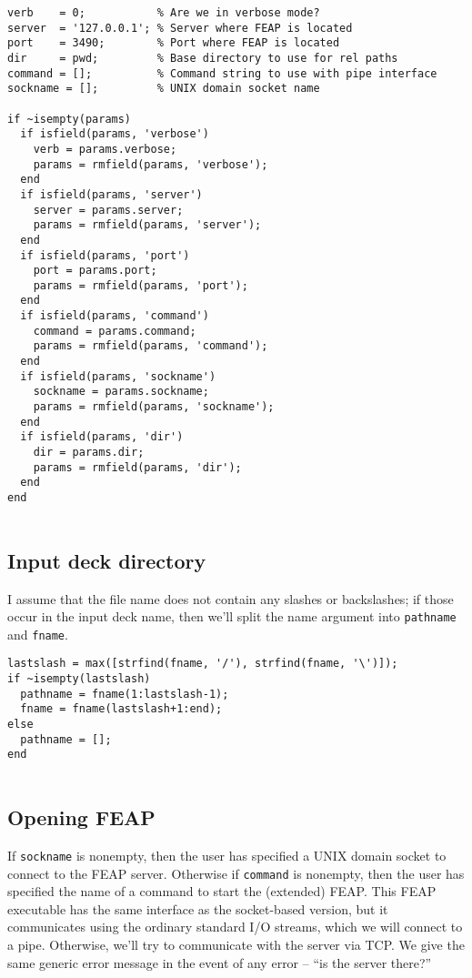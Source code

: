 \begin{verbatim}
verb    = 0;           % Are we in verbose mode?
server  = '127.0.0.1'; % Server where FEAP is located
port    = 3490;        % Port where FEAP is located
dir     = pwd;         % Base directory to use for rel paths
command = [];          % Command string to use with pipe interface
sockname = [];         % UNIX domain socket name

if ~isempty(params)
  if isfield(params, 'verbose')
    verb = params.verbose;
    params = rmfield(params, 'verbose');
  end
  if isfield(params, 'server')
    server = params.server;
    params = rmfield(params, 'server');
  end
  if isfield(params, 'port')
    port = params.port;
    params = rmfield(params, 'port');
  end
  if isfield(params, 'command')
    command = params.command;
    params = rmfield(params, 'command');
  end
  if isfield(params, 'sockname')
    sockname = params.sockname;
    params = rmfield(params, 'sockname');
  end
  if isfield(params, 'dir')
    dir = params.dir;
    params = rmfield(params, 'dir');
  end
end


\end{verbatim}
\subsection{Input deck directory}

I assume that the file name does not contain any slashes or
backslashes; if those occur in the input deck name, then we'll
split the name argument into {\tt pathname} and {\tt fname}.

\begin{verbatim}
lastslash = max([strfind(fname, '/'), strfind(fname, '\')]);
if ~isempty(lastslash)
  pathname = fname(1:lastslash-1);
  fname = fname(lastslash+1:end);
else
  pathname = [];
end


\end{verbatim}
\subsection{Opening FEAP}

If {\tt sockname} is nonempty, then the user has specified
a UNIX domain socket to connect to the FEAP server.  Otherwise
if {\tt command} is nonempty, then the user has specified the
name of a command to start the (extended) FEAP.  This FEAP
executable has the same interface as the socket-based version,
but it communicates using the ordinary standard I/O streams,
which we will connect to a pipe.  Otherwise, we'll try to
communicate with the server via TCP.  We give the same generic error
message in the event of any error -- ``is the server there?''

